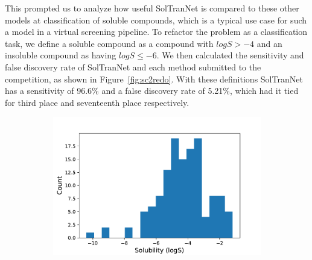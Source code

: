 \documentclass[journal=jmcmar,manuscript=article]{achemso}
\begin{document}
This prompted us to analyze how useful SolTranNet is compared to these other models at classification of soluble compounds, which is a typical use case for such a model in a virtual screening pipeline.
To refactor the problem as a classification task, we define a soluble compound as a compound with $logS > -4$ and an insoluble compound as having $logS \leq -6$.
We then calculated the sensitivity and false discovery rate of SolTranNet and each method submitted to the competition, as shown in Figure~\ref{fig:sc2redo}.
With these definitions SolTranNet has a sensitivity of 96.6\% and a false discovery rate of 5.21\%, which had it tied for third place and seventeenth place respectively.

\begin{figure}[tb]
    \centering
    \begin{subfigure}[t]{0.48\textwidth}
        \centering
        \includegraphics[width=\linewidth]{figures/histogram_solchal2_true_logs.pdf}
    \end{subfigure}
    

\end{figure}
\end{document}
